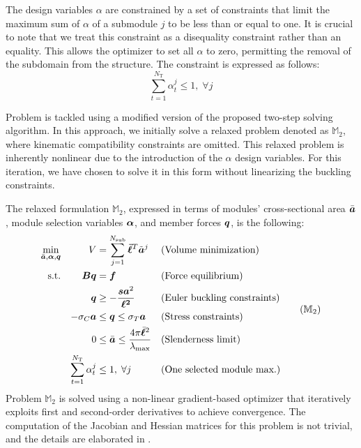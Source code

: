 The design variables $\alpha$ are constrained by a set of constraints that limit the maximum sum of $\alpha$ of a submodule $j$ to be less than or equal to one. It is crucial to note that we treat this constraint as a disequality constraint rather than an equality. This allows the optimizer to set all $\alpha$ to zero, permitting the removal of the subdomain from the structure. The constraint is expressed as follows:
\begin{equation}
    \sum_{t=1}^{N_\text{T}} \alpha_t^j \leq 1, \; \forall j 
\end{equation}

Problem  is tackled using a modified version of the proposed two-step solving algorithm. In this approach, we initially solve a relaxed problem denoted as $\mathbb{M}_2$, where kinematic compatibility constraints are omitted. This relaxed problem is inherently nonlinear due to the introduction of the $\alpha$ design variables. For this iteration, we have chosen to solve it in this form without linearizing the buckling constraints.

The relaxed formulation $\mathbb{M}_2$, expressed in terms of modules' cross-sectional area $\bar{\bm{a}}$, module selection variables $\bm{\alpha}$, and member forces $\bm{q}$, is the following:
\begin{equation}
    \begin{aligned}
    \min_{\bar{\vect{a}}, \vect{\alpha}, \bm{q}}   && V &= \sum_{j=1}^{N_{\text{sub}}}\vect{\bar{\ell}}^T\tilde{\vect{a}}^j && \textrm{(Volume minimization)}\\
    \textrm{s.t.}   && \bm{B}\bm{q} &= \bm{f} && \textrm{(Force equilibrium)}\\
                    && \bm{q} &\geq -\frac{\bm{s}\bm{a}^2}{\bm{\ell^2}} && \textrm{(Euler buckling constraints)} \\
                    && -\sigma_C\bm{a} &\leq \bm{q} \leq \sigma_T\bm{a} && \textrm{(Stress constraints)} \\
                    && 0 &\leq \bar{\vect{a}} \leq \frac{4 \pi \bar{\vect{\ell}}^2}{\lambda_{\text{max}}} && \textrm{(Slenderness limit)} \\
                    && \sum_{t=1}^{N_\text{T}} \alpha_t^j &\leq 1, \; \forall j && \textrm{(One selected module max.)} \\
    \end{aligned}
    \tag{$\mathbb{M}_2$}
    \label{eq:06_optim_relax}
\end{equation}
Problem $\mathbb{M}_2$ is solved using a non-linear gradient-based optimizer that iteratively exploits first and second-order derivatives to achieve convergence. The computation of the Jacobian and Hessian matrices for this problem is not trivial, and the details are elaborated in .

